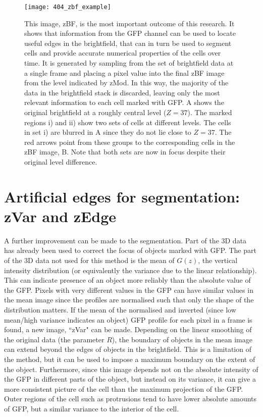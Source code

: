 \begin{figure}[h!]
 \centering
 \texttt{[image: 404\_zbf\_example]}
 \caption[zBF example]{
 	This image, zBF, is the most important outcome of this research. It shows that information from the GFP channel can be used to locate useful edges in the brightfield, that can in turn be used to segment cells and provide accurate numerical properties of the cells over time. It is generated by sampling from the set of brightfield data at a single frame and placing a pixel value into the final zBF image from the level indicated by zMod. In this way, the majority of the data in the brightfield stack is discarded, leaving only the most relevant information to each cell marked with GFP. A shows the original brightfield at a roughly central level ($Z=37$). The marked regions i) and ii) show two sets of cells at different levels. The cells in set i) are blurred in A since they do not lie close to $Z=37$. The red arrows point from these groups to the corresponding cells in the zBF image, B. Note that both sets are now in focus despite their original level difference.
 }
 \label{fig:zbf}
\end{figure}

\section{Artificial edges for segmentation: zVar and zEdge}

A further improvement can be made to the segmentation. Part of the 3D data has already been used to correct the focus of objects marked with GFP. The part of the 3D data not used for this method is the mean of $G(z)$, the vertical intensity distribution (or equivalently the variance due to the linear relationship). This can indicate presence of an object more reliably than the absolute value of the GFP. Pixels with very different values in the GFP can have similar values in the mean image since the profiles are normalised such that only the shape of the distribution matters. If the mean of the normalised and inverted (since low mean/high variance indicates an object) GFP profile for each pixel in a frame is found, a new image, ``zVar" can be made. Depending on the linear smoothing of the original data (the parameter $R$), the boundary of objects in the mean image can extend beyond the edges of objects in the brightfield. This is a limitation of the method, but it can be used to impose a maximum boundary on the extent of the object. Furthermore, since this image depends not on the absolute intensity of the GFP in different parts of the object, but instead on its variance, it can give a more consistent picture of the cell than the maximum projection of the GFP. Outer regions of the cell such as protrusions tend to have lower absolute amounts of GFP, but a similar variance to the interior of the cell.

